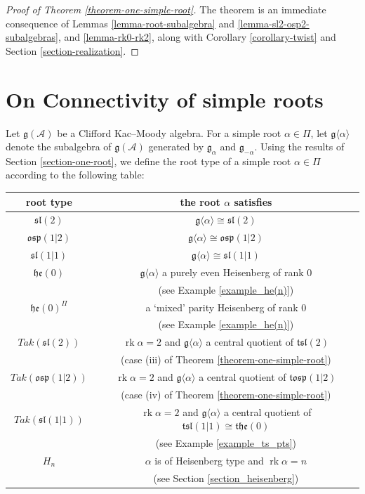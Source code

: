 \documentclass[12pt, a4paper, reqno]{amsart}
\def\e{\mathfrak{e}}
\def\p{\mathfrak{p}}
\def\g{\mathfrak{g}}
\def\h{\mathfrak{h}}
\def\l{\mathfrak{l}}
\def\s{\mathfrak{s}}
\def\o{\mathfrak{o}}
\def\rk{\operatorname{rk}}
\theoremstyle{definition}
\theoremstyle{definition}
\theoremstyle{definition}
\numberwithin{theorem}{section}
\numberwithin{lemma}{section}
\numberwithin{remark}{section}
\numberwithin{definition}{section}
\numberwithin{corollary}{section}
\numberwithin{proposition}{section}
\numberwithin{example}{section}
\begin{document}
	\begin{proof}[Proof of Theorem \ref{theorem-one-simple-root}]
		The theorem is an immediate consequence of Lemmas \ref{lemma-root-subalgebra} and \ref{lemma-sl2-osp2-subalgebras}, and \ref{lemma-rk0-rk2}, along with Corollary \ref{corollary-twist} and Section \ref{section-realization}.
	\end{proof}
	
	\section{On Connectivity of simple roots}\label{section-connectivity}
	
	Let \(\mathfrak{g}(\mathcal{A})\) be a Clifford Kac--Moody algebra. For a simple root \(\alpha \in \Pi\), let \(\mathfrak{g}\langle\alpha\rangle\) denote the subalgebra of \(\mathfrak{g}(\mathcal{A})\) generated by \(\mathfrak{g}_{\alpha}\) and \(\mathfrak{g}_{-\alpha}\). Using the results of Section \ref{section-one-root}, we define the root type of a simple root \(\alpha \in \Pi\) according to the following table: 
	
	\renewcommand{\arraystretch}{1.25}
	\begin{center}
		\begin{tabular}{ | c | c | }
			\hline
			root type  & the root \(\alpha\) satisfies \\ 
			\hline
			\hline
			$\s\l(2)$ & $\g\langle\alpha\rangle\cong\s\l(2)$ \\  
			\hline
			$\o\s\p(1|2)$ & $\g\langle\alpha\rangle\cong\o\s\p(1|2)$ \\  
			\hline
			$\s\l(1|1)$ & $\g\langle\alpha\rangle\cong\s\l(1|1)$ \\
			\hline 
			$\h\e(0)$ & $\g\langle\alpha\rangle$ a purely even Heisenberg of rank 0\\
			& (see Example \ref{example_he(n)})\\
			\hline
			$\h\e(0)^{\Pi}$ & a `mixed' parity Heisenberg of rank 0\\
			& (see Example \ref{example_he(n)})\\
			\hline
			$Tak(\s\l(2))$ & $\rk\alpha=2$ and $\g\langle\alpha\rangle$ a central quotient of $\mathfrak{t}\s\l(2)$ \\
			& (case (iii) of Theorem \ref{theorem-one-simple-root})\\
			\hline 
			$Tak(\o\s\p(1|2))$ & $\rk\alpha=2$ and $\g\langle\alpha\rangle$ a central quotient of $\mathfrak{t}\o\s\p(1|2)$ \\
			& (case (iv) of Theorem \ref{theorem-one-simple-root})\\
			\hline 
			$Tak(\s\l(1|1))$ & $\rk\alpha=2$ and $\g\langle\alpha\rangle$ a central quotient of $\mathfrak{t}\s\l(1|1)\cong\mathfrak{t}\h\e(0)$\\
			& (see Example \ref{example_ts_pts}) \\
			\hline
			$H_n$ & $\alpha$ is of Heisenberg type and $\rk\alpha=n$ \\
			& (see Section \ref{section_heisenberg})\\
			\hline
		\end{tabular}
	\end{center}
	
\end{document}
